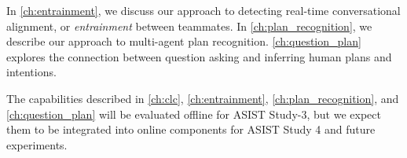 In \autoref{ch:entrainment}, we discuss our approach to detecting real-time
conversational alignment, or \emph{entrainment} between teammates. In
\autoref{ch:plan_recognition}, we describe our approach to multi-agent plan
recognition. \autoref{ch:question_plan} explores the connection between
question asking and inferring human plans and intentions. 

The capabilities described in \autoref{ch:clc}, \autoref{ch:entrainment},
\autoref{ch:plan_recognition}, and \autoref{ch:question_plan} will be evaluated
offline for ASIST Study-3, but we expect them to be integrated into online
components for ASIST Study 4 and future experiments.
